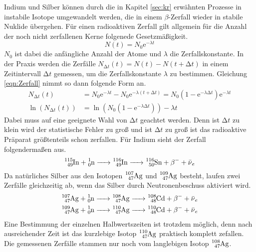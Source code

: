 Indium und Silber können durch die in Kapitel \ref{sec:kr} erwähnten Prozesse in instabile Isotope umgewandelt werden, die in einem $\beta$-Zerfall wieder in stabile Nuklide übergehen.
Für einen radioaktiven Zerfall gilt allgemein für die Anzahl der noch nicht zerfallenen Kerne folgenede Gesetzmäßigkeit.
\begin{equation}
  N(t) = N_0 \text{e}^{-\lambda t}
  \label{eqn:Zerfall}
\end{equation}
$N_0$ ist dabei die anfängliche Anzahl der Atome und $\lambda$ die Zerfallskonstante.
In der Praxis werden die Zerfälle $N_{\increment t}(t) = N(t) - N(t + \increment t)$ in einem Zeitintervall $\increment t$ gemessen, um die Zerfallskonstante $\lambda$ zu bestimmen.
Gleichung \eqref{eqn:Zerfall} nimmt so dann folgende Form an.
\begin{align}
  N_{\increment t}(t) &= N_0 \text{e}^{-\lambda t} - N_0 \text{e}^{-\lambda (t + \increment t)} = N_0 (1 -\text{e}^{-\lambda \increment t}) \text{e}^{-\lambda t} \\
  \ln(N_{\increment t}(t)) &= \ln(N_0 (1 -\text{e}^{-\lambda \increment t})) - \lambda t
\end{align}
Dabei muss auf eine geeignete Wahl von $\increment t$ geachtet werden.
Denn ist $\increment t$ zu klein wird der statistische Fehler zu groß und ist $\increment t$  zu groß ist das radioaktive Präparat größtenteils schon zerfallen.
Für Indium sieht der Zerfall folgendermaßen aus.
\begin{equation}
  \ce{^{115}_49In + ^{1}_0n -> ^{116}_49In -> ^{116}_50Sn + \beta^- + \bar{\nu}_e}
\end{equation}
Da natürliches Silber aus den Isotopen $\ce{^{107}_47Ag}$ und $\ce{^{109}_47Ag}$ besteht, laufen zwei Zerfälle gleichzeitig ab, wenn das Silber durch Neutronenbeschuss aktiviert wird.
\begin{align}
  \ce{^{107}_47Ag + ^{1}_0n -> ^{108}_47Ag -> ^{108}_48Cd + \beta^- + \bar{\nu}_e} \\
  \ce{^{109}_47Ag + ^{1}_0n -> ^{110}_47Ag -> ^{110}_48Cd + \beta^- + \bar{\nu}_e}
\end{align}
Eine Bestimmung der einzelnen Halbwertszeiten ist trotzdem möglich, denn nach ausreichender Zeit ist das kurzlebige Isotop $\ce{^{110}_47Ag}$ praktisch komplett zefallen.
Die gemessenen Zerfälle stammen nur noch vom langlebigen Isotop $\ce{^{108}_47Ag}$. \cite{V702}
